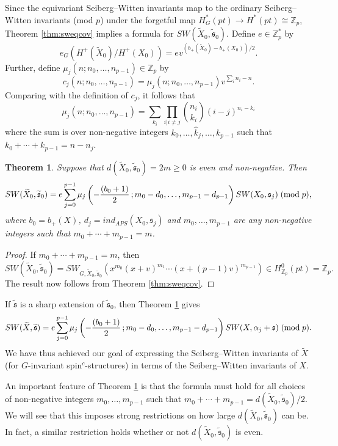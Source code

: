 \documentclass{amsart}
\newtheorem{theorem}{Theorem}[section]
\theoremstyle{definition}
\theoremstyle{remark}
\numberwithin{equation}{section}
\begin{document}
Since the equivariant Seiberg--Witten invariants map to the ordinary Seiberg--Witten invariants (mod $p$) under the forgetful map $H^*_G(pt) \to H^*(pt) \cong \mathbb{Z}_p$, Theorem \ref{thm:sweqcov} implies a formula for $SW(\widetilde{X}_0 , \widetilde{\mathfrak{s}}_0)$. Define $e \in \mathbb{Z}_p^*$ by 
\[
e_G( H^+(\widetilde{X}_0)/H^+(X_0) ) = e v^{(b_+(\widetilde{X}_0) - b_+(X_0) )/2}.
\]
Further, define $\mu_j( n ; n_0 , \dots , n_{p-1}) \in \mathbb{Z}_p$ by
\[
c_j( n ; n_0 , \dots , n_{p-1}) = \mu_j(n ; n_0 , \dots , n_{p-1}) v^{\sum_i n_i - n}.
\]
Comparing with the definition of $c_j$, it follows that
\[
\mu_j(n ; n_0 , \dots , n_{p-1}) = \sum_{k_i} \prod_{i | i \neq j} \binom{n_i}{k_i} (i-j)^{n_i-k_i}
\]
where the sum is over non-negative integers $k_0 , \dots , \hat{k}_j , \dots , k_{p-1}$ such that $k_0 + \cdots + k_{p-1} = n-n_j$.



\begin{theorem}\label{thm:swcov}
Suppose that $d(\widetilde{X}_0 , \widetilde{\mathfrak{s}}_0) = 2m \ge 0$ is even and non-negative. Then
\[
SW(\widetilde{X}_0 , \widetilde{\mathfrak{s}}_0) = e \sum_{j=0}^{p-1} \mu_j\left( -\frac{ (b_0+1) }{2} \, ; m_0-d_0 , \dots , m_{p-1} - d_{p-1} \right) SW(X_0 , \mathfrak{s}_j) \; ({\rm mod} \; p),
\]
where $b_0 = b_+(X)$, $d_j = ind_{APS}( X_0 , \mathfrak{s}_j)$ and $m_0, \dots , m_{p-1}$ are any non-negative integers such that $m_0 + \cdots + m_{p-1} = m$.
\end{theorem}
\begin{proof}
If $m_0 + \cdots + m_{p-1} = m$, then 
\[
SW( \widetilde{X}_0 , \widetilde{\mathfrak{s}}_0) = SW_{G , \widetilde{X}_0 , \widetilde{\mathfrak{s}}_0}( x^{m_0}(x+v)^{m_1} \cdots (x+(p-1)v)^{m_{p-1}}) \in H^0_{\mathbb{Z}_p}(pt) = \mathbb{Z}_p.
\]
The result now follows from Theorem \ref{thm:sweqcov}.
\end{proof}

If $\widetilde{\mathfrak{s}}$ is a sharp extension of $\widetilde{\mathfrak{s}}_0$, then Theorem \ref{thm:swcov} gives
\[
SW(\widetilde{X} , \widetilde{\mathfrak{s}}) = e \sum_{j=0}^{p-1} \mu_j\left( -\frac{ (b_0+1) }{2} \, ; m_0-d_0 , \dots , m_{p-1} - d_{p-1} \right) SW(X , \alpha_j + \mathfrak{s}) \; ({\rm mod} \; p).
\]
We have thus achieved our goal of expressing the Seiberg--Witten invariants of $\widetilde{X}$ (for $G$-invariant spin$^c$-structures) in terms of the Seiberg--Witten invariants of $X$.

An important feature of Theorem \ref{thm:swcov} is that the formula must hold for all choices of non-negative integers $m_0, \dots , m_{p-1}$ such that $m_0 + \cdots + m_{p-1} = d(\widetilde{X}_0 , \widetilde{\mathfrak{s}}_0)/2$. We will see that this imposes strong restrictions on how large $d(\widetilde{X}_0 , \widetilde{\mathfrak{s}}_0)$ can be. In fact, a similar restriction holds whether or not $d(\widetilde{X}_0 , \widetilde{\mathfrak{s}}_0)$ is even.
\end{document}
